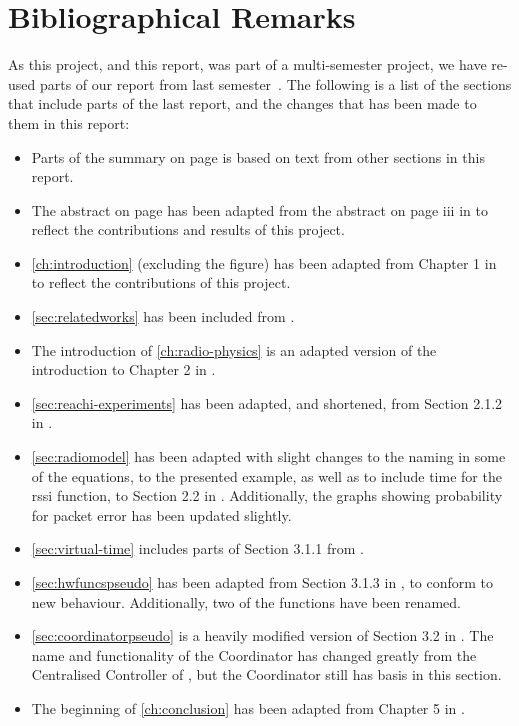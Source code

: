 \chapter{Bibliographical Remarks}
As this project, and this report, was part of a multi-semester project, we have re-used parts of
our report from last semester~\cite{paper:massivesims1}. The following is a list of the sections that include
parts of the last report, and the changes that has been made to them in this report:

\begin{itemize}
    \item Parts of the summary on page \pageref{ch:summary} is based on text from other sections in this
          report.
    \item The abstract on page \pageref{page:titlepage} has been adapted from the abstract on page iii in
          \cite{paper:massivesims1} to reflect the contributions and results of this project.
    \item \autoref{ch:introduction} (excluding the figure) has been adapted from Chapter 1 in
          \cite{paper:massivesims1} to reflect the contributions of this project.
    \item \autoref{sec:relatedworks} has been included from \cite{paper:massivesims1}.
    \item The introduction of \autoref{ch:radio-physics} is an adapted version of the introduction to Chapter
          2 in \cite{paper:massivesims1}.
    \item \autoref{sec:reachi-experiments} has been adapted, and shortened, from Section 2.1.2 in
          \cite{paper:massivesims1}.
    \item \autoref{sec:radiomodel} has been adapted with slight changes to the naming in some of the
          equations, to the presented example, as well as to include time for the \gls{rssi} function, to
          Section 2.2 in \cite{paper:massivesims1}. Additionally, the graphs showing probability for packet
          error has been updated slightly.
    \item \autoref{sec:virtual-time} includes parts of Section 3.1.1 from \cite{paper:massivesims1}.
    \item \autoref{sec:hwfuncspseudo} has been adapted from Section 3.1.3 in \cite{paper:massivesims1}, to
          conform to new behaviour. Additionally, two of the functions have been renamed.
    \item \autoref{sec:coordinatorpseudo} is a heavily modified version of Section 3.2 in
          \cite{paper:massivesims1}. The name and functionality of the Coordinator has changed greatly from
          the Centralised Controller of \cite{paper:massivesims1}, but the Coordinator still has basis in this
          section.
    \item The beginning of \autoref{ch:conclusion} has been adapted from Chapter 5 in
          \cite{paper:massivesims1}.
\end{itemize}